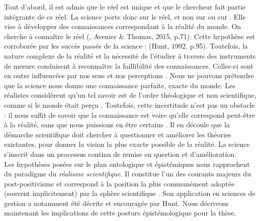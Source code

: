    Tout d’abord, il est admis que le réel est unique et que le chercheur fait partie intégrante de ce réel. La science porte donc sur le réel, et non sur  ou sur . Elle vise à développer des connaissances correspondant à la réalité du monde. On cherche à connaître le réel  (, Avenier \& Thomas, 2015, p.71). Cette hypothèse est corroborée par les succès passés de la science :  (Hunt, 1992, p.95). Toutefois, la nature complexe de la réalité et la nécessité de l’étudier à travers des instruments de mesure conduisent à reconnaître la faillibilité des connaissances. Celles-ci sont en outre influencées par nos sens et nos perceptions \parencite{hunt1992for}. Nous ne pouvons prétendre que la science nous donne une connaissance parfaite, exacte du monde. Les réalistes considèrent qu’un tel savoir est de l’ordre théologique et non scientifique, comme si le monde était perçu . Toutefois, cette incertitude n’est pas un obstacle : il nous suffit de savoir que la connaissance est  voire qu’elle correspond peut-être à la réalité, sans que nous puissions en être certains \parencite{hunt2011philosophical}.  Il en découle que la démarche scientifique doit chercher à questionner et améliorer les théories existantes, pour donner la vision la plus exacte possible de la réalité. La science s’inscrit dans un processus continu de remise en question et d’amélioration. \\ 
    
    Les hypothèses posées sur le plan ontologique et épistémiques nous rapprochent du paradigme du \emph{réalisme scientifique}. Il constitue l’un des courants majeurs du post-positivisme \parencite{avenier2012inscrire} et correspond à la position la plus communément adoptée (souvent implicitement) par la sphère scientifique \parencite{bunge1993realism}. Son application en sciences de gestion a notamment été décrite et encouragée par Hunt. Nous décrivons maintenant les implications de cette posture épistémologique pour la thèse. \\
    
